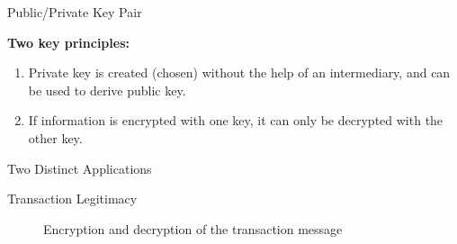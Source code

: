 \documentclass[]{beamer}
\begin{document}
\begin{frame}{Public/Private Key Pair}

	

\vspace{1em}

\textbf{Two key principles:}
\begin{enumerate}
\item<1-> Private key is created (chosen) without the help of an intermediary, and can be used to derive public key.
\item<2-> If information is encrypted with one key, it can only be decrypted with the other key.
\end{enumerate}

\vspace{1.5em}

\end{frame}

\begin{frame}{Two Distinct Applications}
	
\end{frame}


\begin{frame}{Transaction Legitimacy}
	\begin{figure}[h!]
		\center
		
		\caption*{Encryption and decryption of the transaction message}
		\label{fig:asymmeinfach}
	\end{figure}
	
\end{frame}
\end{document}
